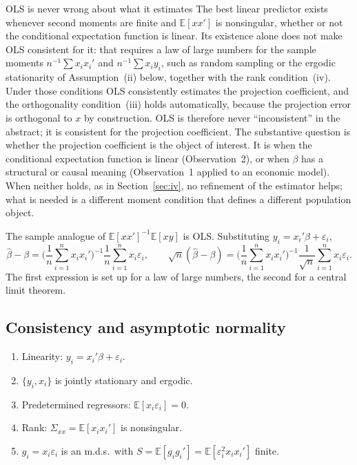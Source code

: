\documentclass[11pt,a4paper]{article}
\newcommand{\E}{\mathbb{E}}
\newcommand{\bh}{\hat\beta}
\newcommand{\sxx}{\Sigma_{xx}}
\begin{document}
\begin{whybox}{OLS is never wrong about what it estimates}
The best linear predictor exists whenever second moments are finite and $\E[xx']$ is nonsingular, whether or not the conditional expectation function is linear. Its existence alone does not make OLS consistent for it: that requires a law of large numbers for the sample moments $n^{-1}\sum x_ix_i'$ and $n^{-1}\sum x_iy_i$, such as random sampling or the ergodic stationarity of Assumption~(ii) below, together with the rank condition~(iv). Under those conditions OLS consistently estimates the projection coefficient, and the orthogonality condition~(iii) holds automatically, because the projection error is orthogonal to $x$ by construction. OLS is therefore never ``inconsistent'' in the abstract; it is consistent for the projection coefficient. The substantive question is whether the projection coefficient is the object of interest. It is when the conditional expectation function is linear (Observation~2), or when $\beta$ has a structural or causal meaning (Observation~1 applied to an economic model). When neither holds, as in Section~\ref{sec:iv}, no refinement of the estimator helps; what is needed is a different moment condition that defines a different population object.
\end{whybox}

The sample analogue of $\E[xx']^{-1}\E[xy]$ is OLS. Substituting $y_i=x_i'\beta+\varepsilon_i$,
\begin{equation}\label{eq:ols_decomp}
\bh-\beta=\Big(\frac1n\sum_{i=1}^nx_ix_i'\Big)^{-1}\frac1n\sum_{i=1}^nx_i\varepsilon_i,
\qquad
\sqrt n(\bh-\beta)=\Big(\frac1n\sum_{i=1}^nx_ix_i'\Big)^{-1}\frac1{\sqrt n}\sum_{i=1}^nx_i\varepsilon_i .
\end{equation}
The first expression is set up for a law of large numbers, the second for a central limit theorem.

\subsection{Consistency and asymptotic normality}

\begin{asmset}
\leavevmode
\begin{enumerate}[label=(\roman*)]
\item Linearity: $y_i=x_i'\beta+\varepsilon_i$.
\item $\{y_i,x_i\}$ is jointly stationary and ergodic.
\item Predetermined regressors: $\E[x_i\varepsilon_i]=0$.
\item Rank: $\sxx=\E[x_ix_i']$ is nonsingular.
\item $g_i=x_i\varepsilon_i$ is an m.d.s.\ with $S=\E[g_ig_i']=\E[\varepsilon_i^2x_ix_i']$ finite.
\end{enumerate}
\end{asmset}
\end{document}
